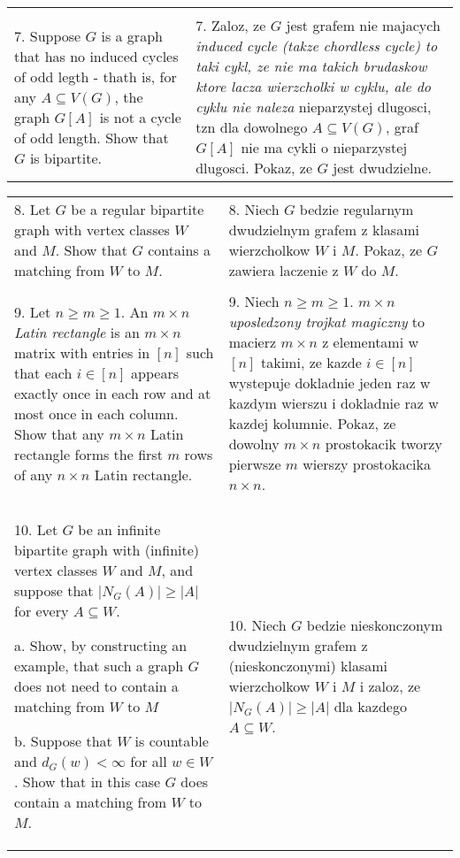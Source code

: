 \documentclass{article}[13pt]
\begin{document}
\begin{tabularx}{\textwidth}{ X X }
         & \\

        7. Suppose $G$ is a graph that has no induced cycles of odd legth - thath is, for any $A\subseteq V(G)$, the graph $G[A]$ is not a cycle of odd length. Show that $G$ is bipartite. & 7. Zaloz, ze $G$ jest grafem nie majacych \emph{induced cycle (takze chordless cycle) to taki cykl, ze nie ma takich brudaskow ktore lacza wierzcholki w cyklu, ale do cyklu nie naleza} nieparzystej dlugosci, tzn dla dowolnego $A\subseteq V(G)$, graf $G[A]$ nie ma cykli o nieparzystej dlugosci. Pokaz, ze $G$ jest dwudzielne.
    \end{tabularx}

    \begin{tabularx}{\textwidth}{ X X }
        8. Let $G$ be a regular bipartite graph with vertex classes $W$ and $M$. Show that $G$ contains a matching from $W$ to $M$. & 8. Niech $G$ bedzie regularnym dwudzielnym grafem z klasami wierzcholkow $W$ i $M$. Pokaz, ze $G$ zawiera laczenie z $W$ do $M$.\\

         & \\
        
        9. Let $n\geq m\geq1$. An $m\times n$ \emph{Latin rectangle} is an $m\times n$ matrix with entries in $[n]$ such that each $i\in[n]$ appears exactly once in each row and at most once in each column. Show that any $m\times n$ Latin rectangle forms the first $m$ rows of any $n\times n$ Latin rectangle. & 9. Niech $n\geq m\geq1$. $m\times n$ \emph{uposledzony trojkat magiczny} to macierz $m\times n$ z elementami w $[n]$ takimi, ze kazde $i\in [n]$ wystepuje dokladnie jeden raz w kazdym wierszu i dokladnie raz w kazdej kolumnie. Pokaz, ze dowolny $m\times n$ prostokacik tworzy pierwsze $m$ wierszy prostokacika $n\times n$.\\

        & \\

        10. Let $G$ be an infinite bipartite graph with (infinite) vertex classes $W$ and $M$, and suppose that $|N_G(A)|\geq|A|$ for every $A\subseteq W$.

        a. Show, by constructing an example, that such a graph $G$ does not need to contain a matching from $W$ to $M$

        b. Suppose that $W$ is countable and $d_G(w)<\infty$ for all $w\in W$. Show that in this case $G$ does contain a matching from $W$ to $M$. & 10. Niech $G$ bedzie nieskonczonym dwudzielnym grafem z (nieskonczonymi) klasami wierzcholkow $W$ i $M$ i zaloz, ze $|N_G(A)|\geq|A|$ dla kazdego $A\subseteq W$.


\end{tabularx}
\end{document}

